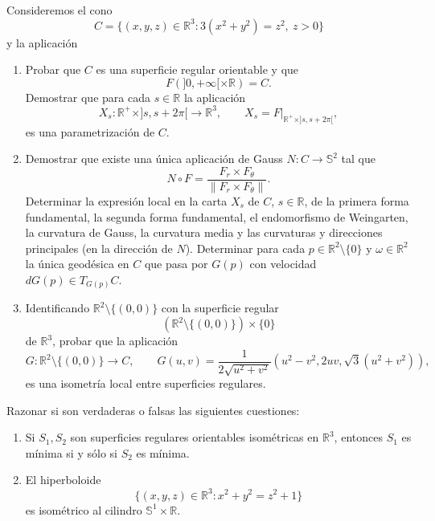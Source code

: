 \documentclass[12pt]{article}
\newcommand{\R}{\mathbb{R}}
\newcommand{\Rmas}{\R^{+}}
\begin{document}
    \begin{ejercicio}
        Consideremos el cono
        $$
        C=\{(x,y,z)\in\mathbb{R}^3:3(x^2+y^2)=z^2,\ z>0\}
        $$
        y la aplicación
        \Func{F}{\Rmas \times \R}{\R^3}{(r,\theta)}{F(r, \theta) := r(\cos(\theta),\sin(\theta),\sqrt{3})}

        \begin{enumerate}
            \item[a)] Probar que $C$ es una superficie regular orientable y que
            $$
            F(]0,+\infty[\times\mathbb{R})=C.
            $$
            Demostrar que para cada $s\in\mathbb{R}$ la aplicación
            $$
            X_s:\Rmas\times ]s,s+2\pi[\longrightarrow \mathbb{R}^3,\qquad
            X_s=F|_{\Rmas\times ]s,s+2\pi[},
            $$
            es una parametrización de $C$.

            \item[b)] Demostrar que existe una única aplicación de Gauss $N:C\to \mathbb{S}^2$ tal que
            $$
            N\circ F=\frac{F_r\times F_\theta}{\|F_r\times F_\theta\|}.
            $$
            Determinar la expresión local en la carta $X_s$ de $C$, $s\in\mathbb{R}$, de la primera forma fundamental, 
            la segunda forma fundamental, el endomorfismo de Weingarten, la curvatura de Gauss, la curvatura media y las 
            curvaturas y direcciones principales (en la dirección de $N$). Determinar para cada $p \in \R^2 \setminus \{0\}$
            y $\omega \in \R^2$ la única geodésica en $C$ que pasa por $G(p)$ con velocidad $dG(p) \in T_{G(p)} C$.

            \item[c)] Identificando $\mathbb{R}^2\setminus\{(0,0)\}$ con la superficie regular
            $$(\mathbb{R}^2\setminus\{(0,0)\})\times\{0\}$$
            de $\mathbb{R}^3$, probar que la aplicación
            $$
            G:\mathbb{R}^2\setminus\{(0,0)\}\longrightarrow C,
            \qquad
            G(u,v)=\frac{1}{2\sqrt{u^2+v^2}}(u^2-v^2,2uv,\sqrt{3}(u^2+v^2)),
            $$
            es una isometría local entre superficies regulares.
        \end{enumerate}
    \end{ejercicio}

    \begin{ejercicio}
        Razonar si son verdaderas o falsas las siguientes cuestiones:

        \begin{enumerate}
            \item[a)] Si $S_1,S_2$ son superficies regulares orientables isométricas en $\mathbb{R}^3$, entonces $S_1$ es mínima si y sólo si $S_2$ es mínima$.$

            \item[b)] El hiperboloide $$\{(x,y,z)\in\mathbb{R}^3:x^2+y^2=z^2+1\}$$ es isométrico al cilindro 
            $\mathbb{S}^1\times \mathbb{R}$.
        \end{enumerate}
    \end{ejercicio}
\end{document}
